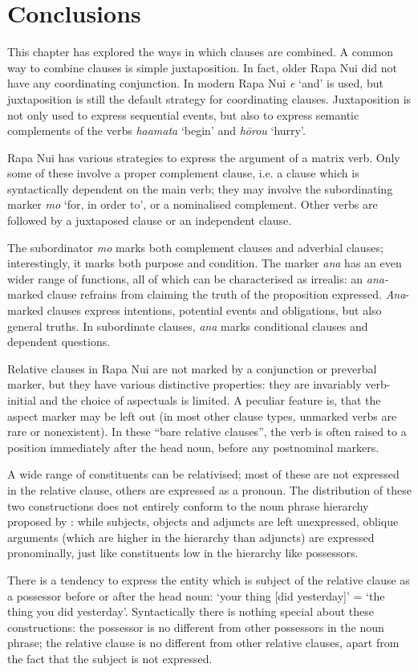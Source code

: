 \section{Conclusions}\label{sec:11.7}

This chapter has explored the ways in which clauses are combined. A common way to combine clauses is simple juxtaposition. In fact, older Rapa Nui did not have any coordinating conjunction. In modern Rapa Nui \textit{{\ꞌ}e} ‘and’ is used, but juxtaposition is still the default strategy for coordinating clauses. Juxtaposition is not only used to express sequential events, but also to express semantic complements of the verbs \textit{ha{\ꞌ}amata} ‘begin’ and \textit{hōrou} ‘hurry’. 

Rapa Nui has various strategies to express the argument of a matrix verb. Only some of these involve a proper complement clause, i.e. a clause which is syntactically dependent on the main verb; they may involve the subordinating marker \textit{mo} ‘for, in order to’, or a nominalised complement. Other verbs are followed by a juxtaposed clause or an independent clause.

The subordinator \textit{mo} marks both complement clauses and adverbial clauses; interestingly, it marks both purpose and condition. The marker \textit{ana} has an even wider range of functions, all of which can be characterised as irrealis: an \textit{ana-}marked clause refrains from claiming the truth of the proposition expressed. \textit{Ana}{}-marked clauses express intentions, potential events and obligations, but also general truths. In subordinate clauses, \textit{ana} marks conditional clauses and dependent questions.

Relative clauses in Rapa Nui are not marked by a conjunction or preverbal marker, but they have various distinctive properties: they are invariably verb-initial and the choice of aspectuals is limited. A peculiar feature is, that the aspect marker may be left out (in most other clause types, unmarked verbs are rare or nonexistent). In these “bare relative clauses”, the verb is often raised to a position immediately after the head noun, before any postnominal markers.

A wide range of constituents can be relativised; most of these are not expressed in the relative clause, others are expressed as a pronoun. The distribution of these two constructions does not entirely conform to the noun phrase hierarchy proposed by \citet{KeenanComrie1977}: while subjects, objects and adjuncts are left unexpressed, oblique arguments (which are higher in the hierarchy than adjuncts) are expressed pronominally, just like constituents low in the hierarchy like possessors.

There is a tendency to express the entity which is subject of the relative clause as a possessor before or after the head noun: ‘your thing [did yesterday]’ = ‘the thing you did yesterday’. Syntactically there is nothing special about these constructions: the possessor is no different from other possessors in the noun phrase; the relative clause is no different from other relative clauses, apart from the fact that the subject is not expressed.

